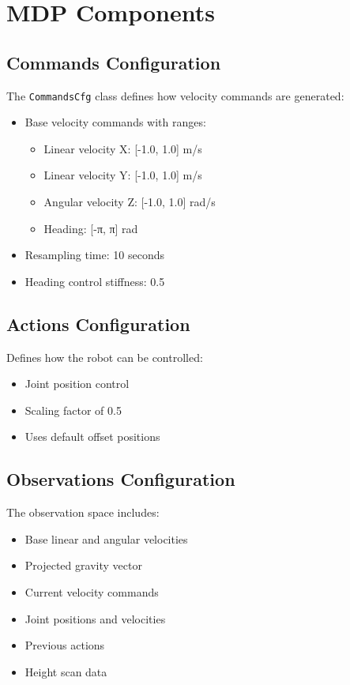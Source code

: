 \documentclass{article}
\begin{document}
\section{MDP Components}

\subsection{Commands Configuration}
The \texttt{CommandsCfg} class defines how velocity commands are generated:
\begin{itemize}
    \item Base velocity commands with ranges:
    \begin{itemize}
        \item Linear velocity X: [-1.0, 1.0] m/s
        \item Linear velocity Y: [-1.0, 1.0] m/s
        \item Angular velocity Z: [-1.0, 1.0] rad/s
        \item Heading: [-π, π] rad
    \end{itemize}
    \item Resampling time: 10 seconds
    \item Heading control stiffness: 0.5
\end{itemize}

\subsection{Actions Configuration}
Defines how the robot can be controlled:
\begin{itemize}
    \item Joint position control
    \item Scaling factor of 0.5
    \item Uses default offset positions
\end{itemize}

\subsection{Observations Configuration}
The observation space includes:
\begin{itemize}
    \item Base linear and angular velocities
    \item Projected gravity vector
    \item Current velocity commands
    \item Joint positions and velocities
    \item Previous actions
    \item Height scan data
\end{itemize}
\end{document}
